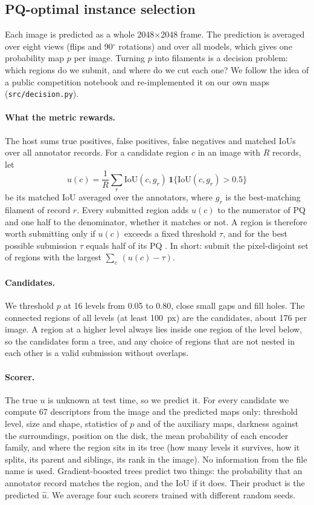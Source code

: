 \documentclass[sigconf]{acmart}
\begin{document}
\subsection{PQ-optimal instance selection}\label{sec:decision}
Each image is predicted as a whole 2048$\times$2048 frame. The prediction is averaged over eight views (flips and 90$^\circ$ rotations) and over all models, which gives one probability map $p$ per image. Turning $p$ into filaments is a decision problem: which regions do we submit, and where do we cut each one? We follow the idea of a public competition notebook \cite{tushhaaarrrr2026filseg} and re-implemented it on our own maps (\texttt{src/decision.py}).

\paragraph{What the metric rewards.} The host sums true positives, false positives, false negatives and matched IoUs over all annotator records. For a candidate region $c$ in an image with $R$ records, let
\[
u(c)=\frac1{R}\sum_{r}\mathrm{IoU}(c,g_r)\,\mathbf 1\{\mathrm{IoU}(c,g_r)>0.5\}
\]
be its matched IoU averaged over the annotators, where $g_r$ is the best-matching filament of record $r$. Every submitted region adds $u(c)$ to the numerator of PQ and one half to the denominator, whether it matches or not. A region is therefore worth submitting only if $u(c)$ exceeds a fixed threshold $\tau$, and for the best possible submission $\tau$ equals half of its PQ \cite{dinkelbach1967fractional}. In short: submit the pixel-disjoint set of regions with the largest $\sum_c\,(u(c)-\tau)$.

\paragraph{Candidates.} We threshold $p$ at 16 levels from 0.05 to 0.80, close small gaps and fill holes. The connected regions of all levels (at least 100~px) are the candidates, about 176 per image. A region at a higher level always lies inside one region of the level below, so the candidates form a tree, and any choice of regions that are not nested in each other is a valid submission without overlaps.

\paragraph{Scorer.} The true $u$ is unknown at test time, so we predict it. For every candidate we compute 67 descriptors from the image and the predicted maps only: threshold level, size and shape, statistics of $p$ and of the auxiliary maps, darkness against the surroundings, position on the disk, the mean probability of each encoder family, and where the region sits in its tree (how many levels it survives, how it splits, its parent and siblings, its rank in the image). No information from the file name is used. Gradient-boosted trees \cite{friedman2001gbm} predict two things: the probability that an annotator record matches the region, and the IoU if it does. Their product is the predicted $\hat u$. We average four such scorers trained with different random seeds.
\end{document}
